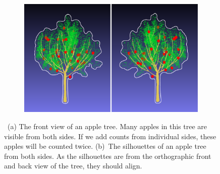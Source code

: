 \begin{figure}[!htbp]
\begin{subfigure}[b]{.7127\columnwidth}
        \includegraphics[width =\textwidth]{figures/merge_both/Tree_Boundary.pdf}
        \caption{\label{fig:Tree_Boundary}}
    \end{subfigure}   
    \caption[Fruit visible from both sides and alignment of silhouettes from front and back]{~(a) The front view of an apple tree. Many apples in this tree are visible from both sides. If we add counts from individual sides, these apples will be counted twice. (b)~The silhouettes of an apple tree from both sides. As the silhouettes are from the orthographic front and back view of the tree, they should align.}
    \label{fig:intro_merge}
\end{figure}






